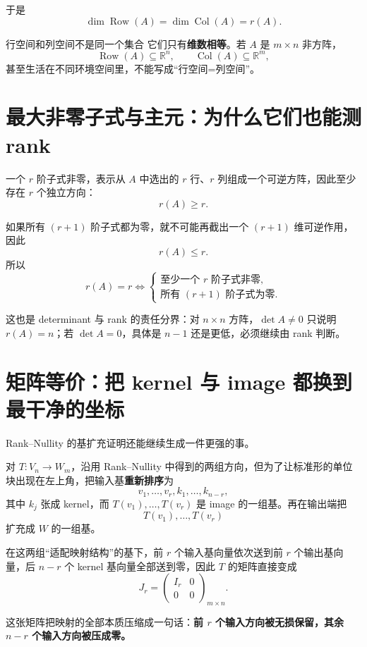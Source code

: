 \documentclass[11pt,a4paper]{ctexart}
\newcommand{\kw}[1]{\textbf{\color{deep}#1}}
\begin{document}
于是
\[
\boxed{\dim\operatorname{Row}(A)=\dim\operatorname{Col}(A)=r(A).}
\]

\begin{warnbox}{行空间和列空间不是同一个集合}
它们只有\kw{维数相等}。若 $A$ 是 $m\times n$ 非方阵，
\[
\operatorname{Row}(A)\subseteq\mathbb R^n,
\qquad
\operatorname{Col}(A)\subseteq\mathbb R^m,
\]
甚至生活在不同环境空间里，不能写成“行空间=列空间”。
\end{warnbox}

\section{最大非零子式与主元：为什么它们也能测 rank}

一个 $r$ 阶子式非零，表示从 $A$ 中选出的 $r$ 行、$r$ 列组成一个可逆方阵，因此至少存在 $r$ 个独立方向：
\[
r(A)\ge r.
\]

如果所有 $(r+1)$ 阶子式都为零，就不可能再截出一个 $(r+1)$ 维可逆作用，因此
\[
r(A)\le r.
\]
所以
\[
\boxed{
r(A)=r
\iff
\begin{cases}
\text{至少一个 $r$ 阶子式非零},\\
\text{所有 $(r+1)$ 阶子式为零}.
\end{cases}}
\]

这也是 determinant 与 rank 的责任分界：对 $n\times n$ 方阵，$\det A\neq0$ 只说明 $r(A)=n$；若 $\det A=0$，具体是 $n-1$ 还是更低，必须继续由 rank 判断。

\section{矩阵等价：把 kernel 与 image 都换到最干净的坐标}

Rank--Nullity 的基扩充证明还能继续生成一件更强的事。

对 $T:V_n\to W_m$，沿用 Rank--Nullity 中得到的两组方向，但为了让标准形的单位块出现在左上角，把输入基\kw{重新排序}为
\[
v_1,\dots,v_r,k_1,\dots,k_{n-r},
\]
其中 $k_j$ 张成 kernel，而 $T(v_1),\dots,T(v_r)$ 是 image 的一组基。再在输出端把
\[
T(v_1),\dots,T(v_r)
\]
扩充成 $W$ 的一组基。

在这两组“适配映射结构”的基下，前 $r$ 个输入基向量依次送到前 $r$ 个输出基向量，后 $n-r$ 个 kernel 基向量全部送到零，因此 $T$ 的矩阵直接变成
\[
\boxed{
J_r=
\begin{pmatrix}
I_r&0\\
0&0
\end{pmatrix}_{m\times n}.
}
\]

这张矩阵把映射的全部本质压缩成一句话：\kw{前 $r$ 个输入方向被无损保留，其余 $n-r$ 个输入方向被压成零。}
\end{document}

